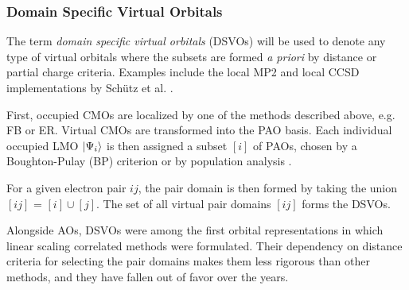 
\subsubsection*{Domain Specific Virtual Orbitals}

The term \emph{domain specific virtual orbitals} (DSVOs) will be used to denote any type of virtual orbitals where the subsets are formed \emph{a priori} by distance or partial charge criteria. Examples include the local MP2 and local CCSD implementations by Schütz et al. \cite{Sch1999,Sch2001,Sch2000}.%

First, occupied CMOs are localized by one of the methods described above, e.g. FB or ER. Virtual CMOs are transformed into the PAO basis. Each individual occupied LMO $\ket{\Psi_i}$ is then assigned a subset $[i]$ of PAOs, chosen by a Boughton-Pulay (BP) criterion \cite{Bou1993} or by population analysis \cite{Mat2008}. 

For a given electron pair $ij$, the pair domain is then formed by taking the union $[ij]$ = $[i] \cup [j]$. The set of all virtual pair domains $[ij]$ forms the DSVOs.

Alongside AOs, DSVOs were among the first orbital representations in which linear scaling correlated methods were formulated. Their dependency on distance criteria for selecting the pair domains makes them less rigorous than other methods, and they have fallen out of favor over the years.


